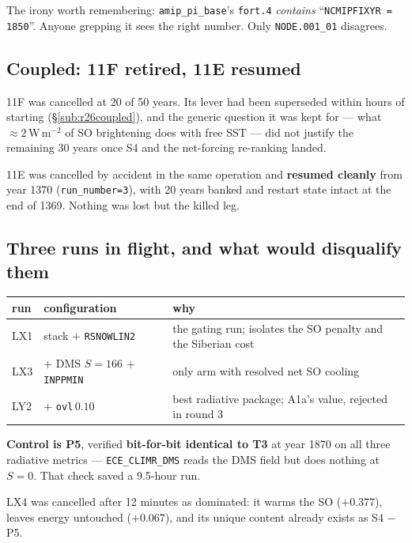 \documentclass[10pt]{article}
\begin{document}
The irony worth remembering: \texttt{amip\_pi\_base}'s \texttt{fort.4} \emph{contains}
``\texttt{NCMIPFIXYR = 1850}''. Anyone grepping it sees the right number. Only
\texttt{NODE.001\_01} disagrees.

\subsection{Coupled: 11F retired, 11E resumed}\label{sub:r27coupled}
11F was cancelled at 20 of 50 years. Its lever had been superseded within hours of
starting (\S\ref{sub:r26coupled}), and the generic question it was kept for --- what
${\approx}2$\,W\,m$^{-2}$ of SO brightening does with free SST --- did not justify the
remaining 30 years once S4 and the net-forcing re-ranking landed.

11E was cancelled by accident in the same operation and \textbf{resumed cleanly} from year
1370 (\texttt{run\_number=3}), with 20 years banked and restart state intact at the end of
1369. Nothing was lost but the killed leg.

\subsection{Three runs in flight, and what would disqualify them}\label{sub:r27long}
\begin{center}\footnotesize
\begin{tabular}{l l l}
\toprule
run & configuration & why \\
\midrule
LX1 & stack $+$ \texttt{RSNOWLIN2} & the gating run; isolates the SO penalty and the Siberian cost \\
LX3 & $+$ DMS $S{=}166$ $+$ \texttt{INPPMIN} & only arm with resolved net SO cooling \\
LY2 & $+$ \texttt{ovl}$\,0.10$ & best radiative package; A1a's value, rejected in round 3 \\
\bottomrule
\end{tabular}
\end{center}

\noindent \textbf{Control is P5}, verified \textbf{bit-for-bit identical to T3} at year
1870 on all three radiative metrics --- \texttt{ECE\_CLIMR\_DMS} reads the DMS field but
does nothing at $S=0$. That check saved a 9.5-hour run.

LX4 was cancelled after 12 minutes as dominated: it warms the SO ($+0.377$), leaves energy
untouched ($+0.067$), and its unique content already exists as S4 $-$ P5.
\end{document}
